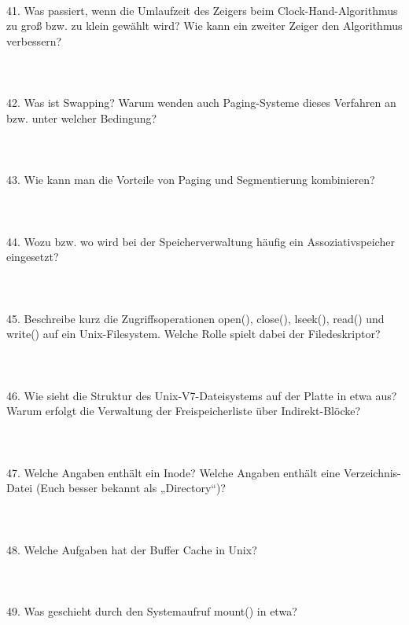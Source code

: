 \documentclass{article}
\begin{document}
\\
\\
\\
41. Was passiert, wenn die Umlaufzeit des Zeigers beim Clock-Hand-Algorithmus zu groß bzw.
zu klein gewählt wird? Wie kann ein zweiter Zeiger den Algorithmus verbessern?
\\
\\
\\
\\
42. Was ist Swapping? Warum wenden auch Paging-Systeme dieses Verfahren an bzw. unter
welcher Bedingung?
\\
\\
\\
\\
43. Wie kann man die Vorteile von Paging und Segmentierung kombinieren?
\\
\\
\\
\\
44. Wozu bzw. wo wird bei der Speicherverwaltung häufig ein Assoziativspeicher eingesetzt?
\\
\\
\\
\\
45. Beschreibe kurz die Zugriffsoperationen open(), close(), lseek(), read() und write()
auf ein Unix-Filesystem. Welche Rolle spielt dabei der Filedeskriptor?
\\
\\
\\
\\
46. Wie sieht die Struktur des Unix-V7-Dateisystems auf der Platte in etwa aus? Warum erfolgt
die Verwaltung der Freispeicherliste über Indirekt-Blöcke?
\\
\\
\\
\\
47. Welche Angaben enthält ein Inode? Welche Angaben enthält eine Verzeichnis-Datei (Euch
besser bekannt als „Directory“)?
\\
\\
\\
\\
48. Welche Aufgaben hat der Buffer Cache in Unix?
\\
\\
\\
\\
49. Was geschieht durch den Systemaufruf mount() in etwa?
\\
\\
\\
\end{document}
